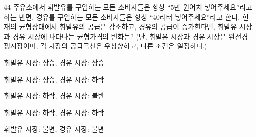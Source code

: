 \begin{question}{44}
주유소에서 휘발유를 구입하는 모든 소비자들은 항상 “5만 원어치 넣어주세요”라고 하는 반면, 경유를 구입하는 모든 소비자들은 항상 “40리터 넣어주세요”라고 한다. 현재의 균형상태에서 휘발유의 공급은 감소하고, 경유의 공급이 증가한다면, 휘발유 시장과 경유 시장에 나타나는 균형가격의 변화는? (단, 휘발유 시장과 경유 시장은 완전경쟁시장이며, 각 시장의 공급곡선은 우상향하고, 다른 조건은 일정하다.)
\begin{choices}
  \item 휘발유 시장: 상승, 경유 시장: 상승
  \item 휘발유 시장: 상승, 경유 시장: 하락
  \item 휘발유 시장: 하락, 경유 시장: 불변
  \item 휘발유 시장: 하락, 경유 시장: 하락
  \item 휘발유 시장: 불변, 경유 시장: 불변
\end{choices}
\end{question}
